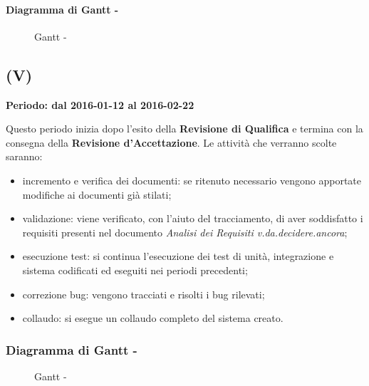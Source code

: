 \documentclass[./PianoDiProgetto.tex]{subfiles}
\begin{document}
  \paragraph{Diagramma di Gantt - \PerC}
    \begin{figure}[!h]
    \centering
    \caption{Gantt - \PerC}
    \end{figure}

  \subsection{\PerV (V)}
  \textbf{Periodo: dal 2016-01-12 al 2016-02-22}

  Questo periodo inizia dopo l'esito della \textbf{Revisione di Qualifica} e termina con la consegna della \textbf{Revisione d'Accettazione}. Le attività che verranno scolte saranno:
  \begin{itemize}
    \item incremento e verifica dei documenti: se ritenuto necessario vengono apportate modifiche ai documenti già stilati;
    \item validazione: viene verificato, con l'aiuto del tracciamento, di aver soddisfatto i requisiti presenti nel documento \textit{Analisi dei Requisiti v.da.decidere.ancora};
    \item esecuzione test: si continua l'esecuzione dei test di unità, integrazione e sistema codificati ed eseguiti nei periodi precedenti;
    \item correzione bug: vengono tracciati e risolti i bug rilevati;
    \item collaudo: si esegue un collaudo completo del sistema creato.
  \end{itemize}

  \subsubsection{Diagramma di Gantt - \PerV}
    \begin{figure}[!h]
    \centering
    \caption{Gantt - \PerV}
    \end{figure}
\end{document}
